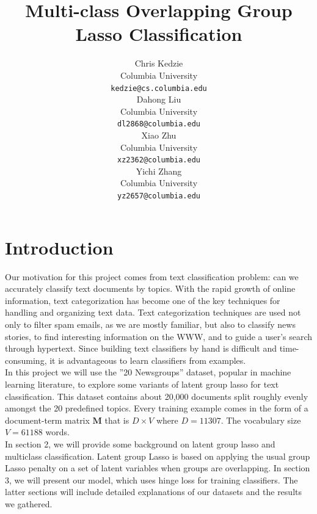 \documentclass[11pt]{article}
\title{Multi-class Overlapping Group Lasso Classification }
\author{Chris Kedzie \\
  Columbia University\\
  {\small \tt kedzie@cs.columbia.edu} \\\And
  Dahong Liu \\
  Columbia University\\
  {\small \tt dl2868@columbia.edu} \\\And
  Xiao Zhu\\
  Columbia University\\
  {\small \tt xz2362@columbia.edu} \\\And
  Yichi Zhang\\
  Columbia University\\
  {\small \tt yz2657@columbia.edu} \\}
\date{}
\begin{document}
\maketitle

\section{Introduction}
Our motivation for this project comes from text classification problem: 
can we accurately classify text documents by topics. With the rapid growth 
of online information, text categorization has become one of the key techniques 
for handling and organizing text data. Text categorization techniques are used 
not only to filter spam emails, as we are mostly familiar, but also to classify 
news stories, to find interesting information on the WWW, and to guide a 
user's search through hypertext. Since building text classifiers by hand is 
difficult and time-consuming, it is advantageous to learn classifiers from examples. \\

In this project we will use the ''20 Newsgroups'' dataset, popular in machine 
learning literature, to explore some variants of latent group lasso for text classification. 
This dataset contains about 20,000 documents split roughly evenly amongst the 20 
predefined topics. Every training example comes in the form of a document-term 
matrix $\mathbf{M}$ that is $D\times V$ where $D=11307$. The vocabulary 
size $V= 61188$ words. \\

In section 2, we will provide some background on latent group lasso and 
multiclass classification. Latent group Lasso is based on applying the usual 
group Lasso penalty on a set of latent variables when groups are overlapping.
In section 3, we will present our model, which uses hinge loss for training classifiers. 
The latter sections will include detailed explanations of our datasets and the 
results we gathered.
\end{document}

